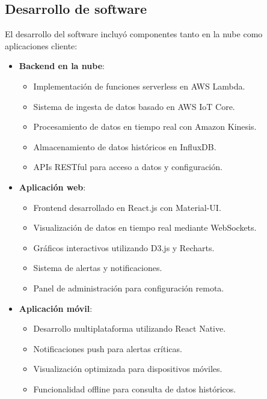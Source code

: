 \documentclass{report}          %
\begin{document}
            \subsection{Desarrollo de software}
                El desarrollo del software incluyó componentes tanto en la nube como aplicaciones cliente:

                \begin{itemize}
                    \item \textbf{Backend en la nube}:
                    \begin{itemize}
                        \item Implementación de funciones serverless en AWS Lambda.
                        \item Sistema de ingesta de datos basado en AWS IoT Core.
                        \item Procesamiento de datos en tiempo real con Amazon Kinesis.
                        \item Almacenamiento de datos históricos en InfluxDB.
                        \item APIs RESTful para acceso a datos y configuración.
                    \end{itemize}
                    
                    \item \textbf{Aplicación web}:
                    \begin{itemize}
                        \item Frontend desarrollado en React.js con Material-UI.
                        \item Visualización de datos en tiempo real mediante WebSockets.
                        \item Gráficos interactivos utilizando D3.js y Recharts.
                        \item Sistema de alertas y notificaciones.
                        \item Panel de administración para configuración remota.
                    \end{itemize}
                    
                    \item \textbf{Aplicación móvil}:
                    \begin{itemize}
                        \item Desarrollo multiplataforma utilizando React Native.
                        \item Notificaciones push para alertas críticas.
                        \item Visualización optimizada para dispositivos móviles.
                        \item Funcionalidad offline para consulta de datos históricos.
                    \end{itemize}
                \end{itemize}
\end{document}
